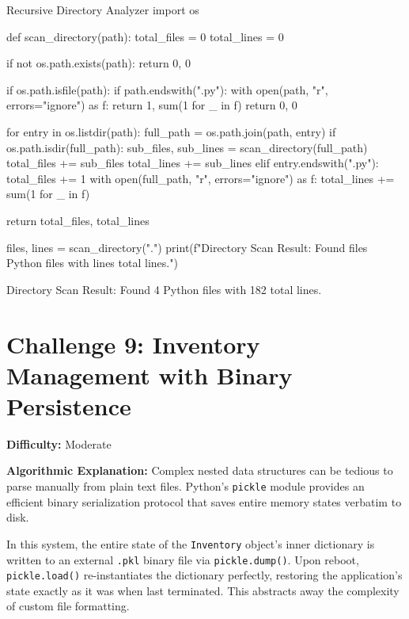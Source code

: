 \begin{pythoncode}{Recursive Directory Analyzer}
import os

def scan_directory(path):
    total_files = 0
    total_lines = 0
    
    if not os.path.exists(path):
        return 0, 0
        
    if os.path.isfile(path):
        if path.endswith(".py"):
            with open(path, "r", errors="ignore") as f:
                return 1, sum(1 for _ in f)
        return 0, 0
        
    for entry in os.listdir(path):
        full_path = os.path.join(path, entry)
        if os.path.isdir(full_path):
            sub_files, sub_lines = scan_directory(full_path)
            total_files += sub_files
            total_lines += sub_lines
        elif entry.endswith(".py"):
            total_files += 1
            with open(full_path, "r", errors="ignore") as f:
                total_lines += sum(1 for _ in f)
                
    return total_files, total_lines

files, lines = scan_directory(".")
print(f"Directory Scan Result: Found {files} Python files with {lines} total lines.")
\end{pythoncode}

\begin{outputbox}
Directory Scan Result: Found 4 Python files with 182 total lines.
\end{outputbox}

\section{Challenge 9: Inventory Management with Binary Persistence}

\textbf{Difficulty:} Moderate

\textbf{Algorithmic Explanation:}
Complex nested data structures can be tedious to parse manually from plain text files. Python's \texttt{pickle} module provides an efficient binary serialization protocol that saves entire memory states verbatim to disk. 

In this system, the entire state of the \texttt{Inventory} object's inner dictionary is written to an external \texttt{.pkl} binary file via \texttt{pickle.dump()}. Upon reboot, \texttt{pickle.load()} re-instantiates the dictionary perfectly, restoring the application's state exactly as it was when last terminated. This abstracts away the complexity of custom file formatting.

